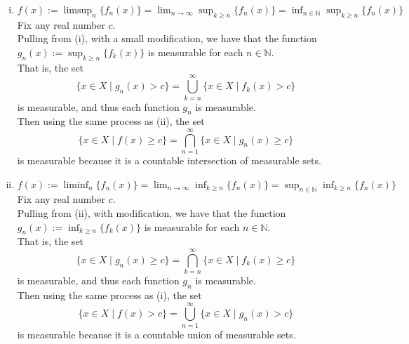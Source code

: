 \begin{enumerate}
\begin{enumerate}[(i)]
        \item $f(x):=\limsup_n\{f_n(x)\}=\lim_{n\to\infty}\sup_{k\ge n}\{f_n(x)\}=\inf_{n\in\mathbb{N}}\sup_{k\ge n}\{f_n(x)\}$
        \\Fix any real number $c$.
        \\Pulling from (i), with a small modification, we have that the function $g_n(x):=\sup_{k\ge n}\{f_k(x)\}$ is measurable for each $n\in\mathbb{N}$.
        \\That is, the set
        \[
            \{x\in X\mid g_n(x)> c\}=\bigcup_{k=n}^\infty\{x\in X\mid f_k(x)> c\}
        \]
        is measurable, and thus each function $g_n$ is measurable.
        \\Then using the same process as (ii), the set
        \[
            \{x\in X\mid f(x)\ge c\}=\bigcap_{n=1}^\infty\{x\in X\mid g_n(x)\ge c\}%
        \]
        is measurable because it is a countable intersection of measurable sets.
        \item $f(x):=\liminf_n\{f_n(x)\}=\lim_{n\to\infty}\inf_{k\ge n}\{f_n(x)\}=\sup_{n\in\mathbb{N}}\inf_{k\ge n}\{f_n(x)\}$
        \\Fix any real number $c$.
        \\Pulling from (ii), with modification, we have that the function $g_n(x):=\inf_{k\ge n}\{f_k(x)\}$ is measurable for each $n\in\mathbb{N}$.
        \\That is, the set
        \[
            \{x\in X\mid g_n(x)\ge c\}=\bigcap_{k=n}^\infty\{x\in X\mid f_k(x)\ge c\}
        \]
        is measurable, and thus each function $g_n$ is measurable.
        \\Then using the same process as (i), the set
        \[
            \{x\in X\mid f(x)> c\}=\bigcup_{n=1}^\infty\{x\in X\mid g_n(x)> c\}%
        \]
        is measurable because it is a countable union of measurable sets.


\end{enumerate}
\end{enumerate}
